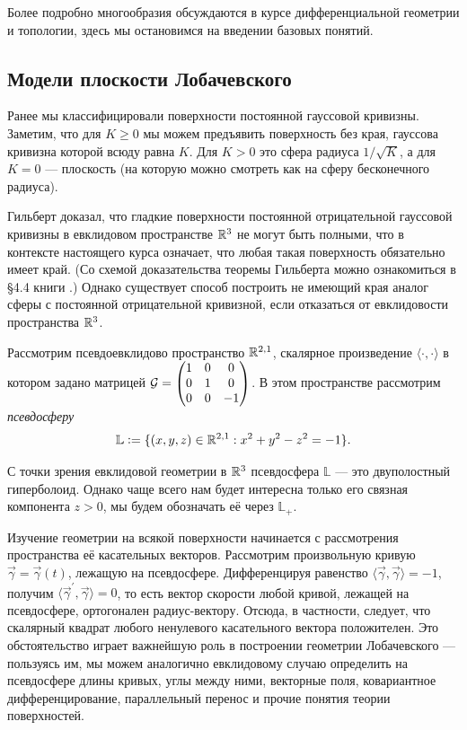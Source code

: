 Более подробно многообразия обсуждаются в курсе дифференциальной геометрии и топологии, здесь мы остановимся на введении базовых понятий.

\subsection{Модели плоскости Лобачевского}

Ранее мы классифицировали поверхности постоянной гауссовой кривизны. Заметим, что для $K \geqslant 0$ мы можем предъявить поверхность без края, гауссова кривизна которой всюду равна $K$. Для $K > 0$ это сфера радиуса $1 / \sqrt{K}$, а для $K = 0$ --- плоскость (на которую можно смотреть как на сферу бесконечного радиуса).

Гильберт доказал, что гладкие поверхности постоянной отрицательной гауссовой кривизны в евклидовом пространстве $\mathbb{R}^3$ не могут быть полными, что в контексте настоящего курса означает, что любая такая поверхность обязательно имеет край. (Со схемой доказательства теоремы Гильберта можно ознакомиться в \S 4{.}4 книги \cite{NT14}.) Однако существует способ построить не имеющий края аналог сферы с постоянной отрицательной кривизной, если отказаться от евклидовости пространства $\mathbb{R}^3$.

Рассмотрим псевдоевклидово пространство $\mathbb{R}^{2, 1}$, скалярное произведение $\langle\cdot, \cdot\rangle$ в котором задано матрицей $\displaystyle\mathcal{G} =
\begin{pmatrix}
	1 & 0 & 0\\
	0 & 1 & 0\\
	0 & 0 & -1
\end{pmatrix}$. В этом пространстве рассмотрим \textit{псевдосферу}
\[
	\mathbb{L} \vcentcolon = \{(x, y, z) \in \mathbb{R}^{2, 1} : x^2 + y^2 - z^2 = -1\}.
\]

С точки зрения евклидовой геометрии в $\mathbb{R}^3$ псевдосфера $\mathbb{L}$ --- это двуполостный гиперболоид. Однако чаще всего нам будет интересна только его связная компонента $z > 0$, мы будем обозначать её через $\mathbb{L}_+$.

Изучение геометрии на всякой поверхности начинается с рассмотрения пространства её касательных векторов. Рассмотрим произвольную кривую $\vec{\gamma} = \vec{\gamma}(t)$, лежащую на псевдосфере. Дифференцируя равенство $\langle\vec{\gamma}, \vec{\gamma}\rangle = -1$, получим $\langle\vec{\gamma}^\prime, \vec{\gamma}\rangle = 0$, то есть вектор скорости любой кривой, лежащей на псевдосфере, ортогонален радиус-вектору. Отсюда, в частности, следует, что скалярный квадрат любого ненулевого касательного вектора положителен. Это обстоятельство играет важнейшую роль в построении геометрии Лобачевского --- пользуясь им, мы можем аналогично евклидовому случаю определить на псевдосфере длины кривых, углы между ними, векторные поля, ковариантное дифференцирование, параллельный перенос и прочие понятия теории поверхностей.

